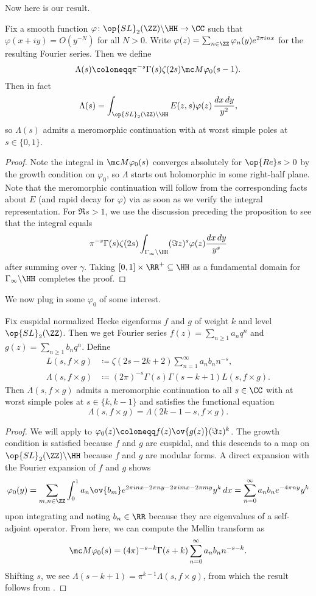 \documentclass{article}
\begin{document}
Now here is our result.
\begin{proposition} \label{prop:rankin-selberg}
	Fix a smooth function $\varphi\colon\op{SL}_2(\ZZ)\backslash\HH\to\CC$ such that $\varphi(x+iy)=O\left(y^{-N}\right)$ for all $N>0$. Write $\varphi(z)=\sum_{n\in\ZZ}\varphi_n(y)e^{2\pi inx}$ for the resulting Fourier series. Then we define
	\[\Lambda(s)\coloneqq\pi^{-s}\Gamma(s)\zeta(2s)\mc M\varphi_0(s-1).\]
	Then in fact
	\[\Lambda(s)=\int_{\op{SL}_2(\ZZ)\backslash\HH}E(z,s)\varphi(z)\,\frac{dx\,dy}{y^2},\]
	so $\Lambda(s)$ admits a meromorphic continuation with at worst simple poles at $s\in\{0,1\}$.
\end{proposition}
\begin{proof}
	Note the integral in $\mc M\varphi_0(s)$ converges absolutely for $\op{Re}s>0$ by the growth condition on $\varphi_0$, so $\Lambda$ starts out holomorphic in some right-half plane. Note that the meromorphic continuation will follow from the corresponding facts about $E$ (and rapid decay for $\varphi$) via  as soon as we verify the integral representation. For $\Re s>1$, we use the discussion preceding the proposition to see that the integral equals
	\[\pi^{-s}\Gamma(s)\zeta(2s)\int_{\Gamma_\infty\backslash\HH}(\Im z)^s\varphi(z)\frac{dx\,dy}{y^s}\]
	after summing over $\gamma$. Taking $[0,1]\times\RR^+\subseteq\HH$ as a fundamental domain for $\Gamma_\infty\backslash\HH$ completes the proof.
\end{proof}
We now plug in some $\varphi_0$ of some interest.
\begin{theorem}
	Fix cuspidal normalized Hecke eigenforms $f$ and $g$ of weight $k$ and level $\op{SL}_2(\ZZ)$. Then we get Fourier series $f(z)=\sum_{n\ge1}a_nq^n$ and $g(z)=\sum_{n\ge1}b_nq^n$. Define
	\begin{align*}
		L(s,f\times g) &\coloneqq \zeta(2s-2k+2)\sum_{n=1}^\infty a_nb_nn^{-s}, \\
		\Lambda(s,f\times g) &\coloneqq (2\pi)^{-s}\Gamma(s)\Gamma(s-k+1)L(s,f\times g).
	\end{align*}
	Then $\Lambda(s,f\times g)$ admits a meromorphic continuation to all $s\in\CC$ with at worst simple poles at $s\in\{k,k-1\}$ and satisfies the functional equation
	\[\Lambda(s,f\times g)=\Lambda(2k-1-s,f\times g).\]
\end{theorem}
\begin{proof}
	We will apply  to $\varphi_0(z)\coloneqq f(z)\ov{g(z)}(\Im z)^k$. The growth condition is satisfied because $f$ and $g$ are cuspidal, and this descends to a map on $\op{SL}_2(\ZZ)\backslash\HH$ because $f$ and $g$ are modular forms. A direct expansion with the Fourier expansion of $f$ and $g$ shows
	\[\varphi_0(y)=\sum_{m,n\in\ZZ}\int_0^1a_n\ov{b_m}e^{2\pi inx-2\pi ny-2\pi imx-2\pi my}y^k\,dx=\sum_{n=0}^\infty a_nb_ne^{-4\pi ny}y^k\]
	upon integrating and noting $b_n\in\RR$ because they are eigenvalues of a self-adjoint operator. From here, we can compute the Mellin transform as
	\[\mc M\varphi_0(s)=(4\pi)^{-s-k}\Gamma(s+k)\sum_{n=0}^\infty a_nb_nn^{-s-k}.\]
	Shifting $s$, we see $\Lambda(s-k+1)=\pi^{k-1}\Lambda(s,f\times g)$, from which the result follows from .
\end{proof}
\end{document}
